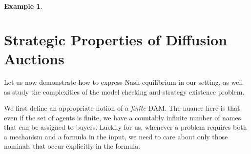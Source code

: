 \documentclass[letterpaper]{article} %
\theoremstyle{definition}
\newtheorem{example}{Example}
\newcommand{\munyque}[1]{{[\color{red}#1]}}
\begin{document}
\begin{example}
    

\end{example}

\section{Strategic Properties of Diffusion Auctions}
Let us now demonstrate how to express Nash equilibrium in our setting, as well as study the complexities of the model checking and strategy existence problem. 

We first define an appropriate notion of a \textit{finite} DAM. The nuance here is that even if the set of agents is finite, we have a countably infinite number of names that can be assigned to buyers. Luckily for us, whenever a problem requires both a mechanism and a formula in the input, we need to care about only those nominals that occur explicitly in the formula. 
\end{document}
